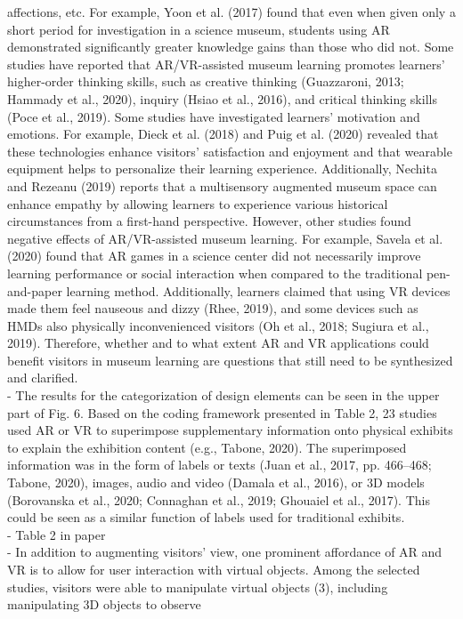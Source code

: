 affections, etc. For example, Yoon et al. (2017) found that even when given only a short period for investigation in a science
museum, students using AR demonstrated significantly greater knowledge gains than those who did not. Some studies have reported
that AR/VR-assisted museum learning promotes learners’ higher-order thinking skills, such as creative thinking (Guazzaroni, 2013;
Hammady et al., 2020), inquiry (Hsiao et al., 2016), and critical thinking skills (Poce et al., 2019). Some studies have investigated
learners’ motivation and emotions. For example, Dieck et al. (2018) and Puig et al. (2020) revealed that these technologies enhance
visitors’ satisfaction and enjoyment and that wearable equipment helps to personalize their learning experience. Additionally, Nechita
and Rezeanu (2019) reports that a multisensory augmented museum space can enhance empathy by allowing learners to experience
various historical circumstances from a first-hand perspective.
However, other studies found negative effects of AR/VR-assisted museum learning. For example, Savela et al. (2020) found that AR
games in a science center did not necessarily improve learning performance or social interaction when compared to the traditional
pen-and-paper learning method. Additionally, learners claimed that using VR devices made them feel nauseous and dizzy (Rhee,
2019), and some devices such as HMDs also physically inconvenienced visitors (Oh et al., 2018; Sugiura et al., 2019). Therefore,
whether and to what extent AR and VR applications could benefit visitors in museum learning are questions that still need to be
synthesized and clarified.
\\
- The results for the categorization of design elements can be seen in the upper part of Fig. 6. Based on the coding framework
presented in Table 2, 23 studies used AR or VR to superimpose supplementary information onto physical exhibits to explain the
exhibition content (e.g., Tabone, 2020). The superimposed information was in the form of labels or texts (Juan et al., 2017, pp.
466–468; Tabone, 2020), images, audio and video (Damala et al., 2016), or 3D models (Borovanska et al., 2020; Connaghan et al.,
2019; Ghouaiel et al., 2017). This could be seen as a similar function of labels used for traditional exhibits.
\\
- Table 2 in paper
\\
- In addition to augmenting visitors’ view, one prominent affordance of AR and VR is to allow for user interaction with virtual
objects. Among the selected studies, visitors were able to manipulate virtual objects (3), including manipulating 3D objects to observe
